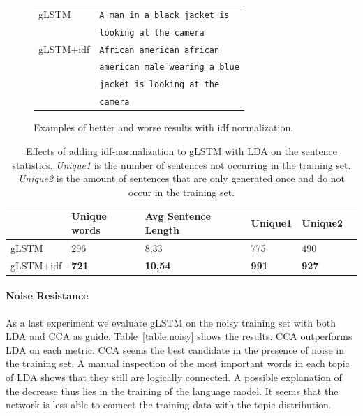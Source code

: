 \documentclass[twoside,twocolumn]{article}
\begin{document}
\begin{figure}
\begin{minipage}[t]{.45\textwidth}
	\end{minipage}\hfill
	\begin{minipage}[t]{.7\textwidth}
		\vspace{0pt}
		\begin{tabular}{ll}
			gLSTM & \texttt{A man in a black jacket is} \\ 
			~ & \texttt{looking at the camera} \\
			gLSTM+idf & \texttt{African american african}\\
			~ & \texttt{american male wearing a blue} \\
			~ & \texttt{jacket is looking at the} \\
			~ & \texttt{camera} \\
		\end{tabular}
	\end{minipage}
	\caption{Examples of better and worse results with idf normalization.}
	\label{fig:idf}
\end{figure}

    \begin{table}
        \centering
        \begin{tabular}{llllll}
            ~                   & Unique words& Avg Sentence Length & Unique1 & Unique2 \\ \hline
            gLSTM                         & 296   & 8,33   & 775   & 490  \\
            
            gLSTM+idf                 & \textbf{721}   & \textbf{10,54}   & \textbf{991}   & \textbf{927}    \\\hline
        \end{tabular}
        \caption{Effects of adding idf-normalization to gLSTM with LDA on the sentence statistics. \emph{Unique1} is the number of sentences not occurring in the training set. \emph{Unique2} is the amount of sentences that are only generated once and do not occur in the training set.}
        \label{table:idf-stats}
    \end{table}

\paragraph{Noise Resistance}
As a last experiment we evaluate gLSTM on the noisy training set with both LDA and CCA as guide.
Table~\ref{table:noisy} shows the results. CCA outperforms LDA on each metric. CCA seems the best candidate in the presence of noise in the training set. A manual inspection of the most important words in each topic of LDA shows that they still are logically connected. A possible explanation of the decrease thus lies in the training of the language model. It seems that the network is less able to connect the training data with the topic distribution.
\end{document}
